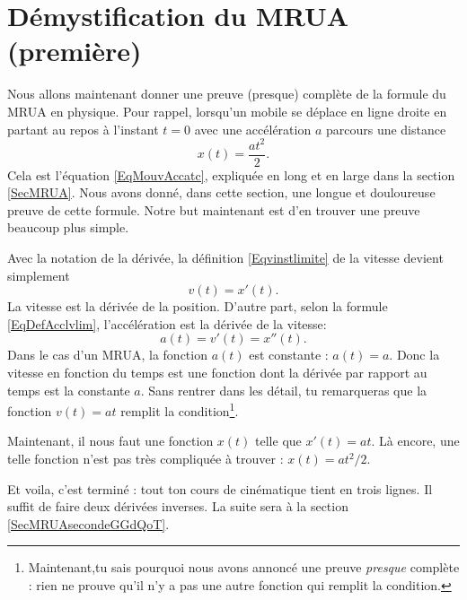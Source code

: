 \documentclass[a4paper,12pt]{book}
\theoremstyle{mes_exemples}	\newtheorem{exemple}[numtho]{Exemple}
\theoremstyle{mes_tho}
\begin{document}
					\section{Démystification du MRUA (première)}		\label{SecDemMRUAun}

Nous allons maintenant donner une preuve (presque) complète de la formule du MRUA en physique. Pour rappel, lorsqu'un mobile se déplace en ligne droite en partant au repos à l'instant $t=0$ avec une accélération $a$ parcours une distance
\begin{equation}
	x(t)=\frac{ at^2 }{ 2 }.
\end{equation}
Cela est l'équation \eqref{EqMouvAccatc}, expliquée en long et en large dans la section \ref{SecMRUA}. Nous avons donné, dans cette section, une longue et douloureuse preuve de cette formule. Notre but maintenant est d'en trouver une preuve beaucoup plus simple.

Avec la notation de la dérivée, la définition \eqref{Eqvinstlimite} de la vitesse devient simplement
\begin{equation}
	v(t)=x'(t).
\end{equation}
La vitesse est la dérivée de la position. D'autre part, selon la formule \eqref{EqDefAcclvlim}, l'accélération est la dérivée de la vitesse:
\begin{equation}
	a(t)=v'(t)=x''(t).
\end{equation}
Dans le cas d'un MRUA, la fonction $a(t)$ est constante : $a(t)=a$. Donc la vitesse en fonction du temps est une fonction dont la dérivée par rapport au temps est la constante $a$. Sans rentrer dans les détail, tu remarqueras que la fonction $v(t)=at$ remplit la condition\footnote{Maintenant,tu sais pourquoi nous avons annoncé une preuve \emph{presque} complète : rien ne prouve qu'il n'y a pas une autre fonction qui remplit la condition.}.

Maintenant, il nous faut une fonction $x(t)$ telle que $x'(t)=at$. Là encore, une telle fonction n'est pas très compliquée à trouver : $x(t)=at^2/2$.

Et voila, c'est terminé : tout ton cours de cinématique tient en trois lignes. Il suffit de faire deux dérivées inverses. La suite sera à la section \ref{SecMRUAsecondeGGdQoT}.

\end{document}
